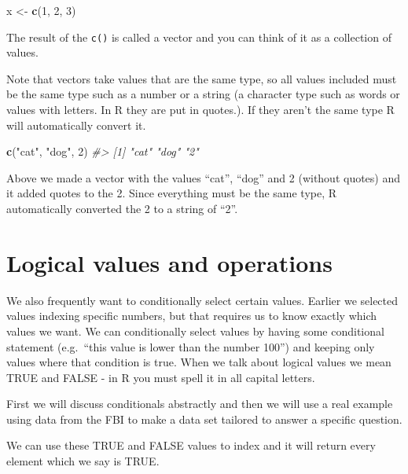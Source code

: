 \documentclass[
  12pt,
]{book}
\newenvironment{Shaded}{\begin{snugshade}}{\end{snugshade}}
\newcommand{\CommentTok}[1]{\textcolor[rgb]{0.37,0.37,0.37}{\textit{#1}}}
\newcommand{\DecValTok}[1]{\textcolor[rgb]{0.06,0.06,0.06}{#1}}
\newcommand{\KeywordTok}[1]{\textcolor[rgb]{0.27,0.27,0.27}{\textbf{#1}}}
\newcommand{\NormalTok}[1]{#1}
\newcommand{\StringTok}[1]{\textcolor[rgb]{0.5,0.5,0.5}{#1}}
\begin{document}
\begin{Shaded}
\begin{Highlighting}[]
\NormalTok{x <{-}}\StringTok{ }\KeywordTok{c}\NormalTok{(}\DecValTok{1}\NormalTok{, }\DecValTok{2}\NormalTok{, }\DecValTok{3}\NormalTok{)}
\end{Highlighting}
\end{Shaded}

The result of the \texttt{c()} is called a vector and you can think of it as a collection of values.

Note that vectors take values that are the same type, so all values included must be the same type such as a number or a string (a character type such as words or values with letters. In R they are put in quotes.). If they aren't the same type R will automatically convert it.

\begin{Shaded}
\begin{Highlighting}[]
\KeywordTok{c}\NormalTok{(}\StringTok{"cat"}\NormalTok{, }\StringTok{"dog"}\NormalTok{, }\DecValTok{2}\NormalTok{)}
\CommentTok{\#> [1] "cat" "dog" "2"}
\end{Highlighting}
\end{Shaded}

Above we made a vector with the values ``cat'', ``dog'' and 2 (without quotes) and it added quotes to the 2. Since everything must be the same type, R automatically converted the 2 to a string of ``2''.

\hypertarget{logical-values-and-operations}{%
\section{Logical values and operations}\label{logical-values-and-operations}}

We also frequently want to conditionally select certain values. Earlier we selected values indexing specific numbers, but that requires us to know exactly which values we want. We can conditionally select values by having some conditional statement (e.g.~``this value is lower than the number 100'') and keeping only values where that condition is true. When we talk about logical values we mean TRUE and FALSE - in R you must spell it in all capital letters.

First we will discuss conditionals abstractly and then we will use a real example using data from the FBI to make a data set tailored to answer a specific question.

We can use these TRUE and FALSE values to index and it will return every element which we say is TRUE.
\end{document}
